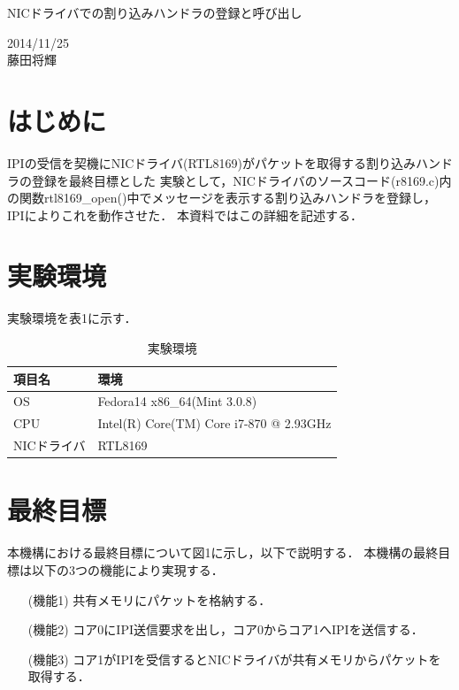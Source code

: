 \documentclass[12pt]{jsarticle}
\begin{document}

\begin{center}
{\LARGE NICドライバでの割り込みハンドラの登録と呼び出し}
\end{center}

\begin{flushright}
  2014/11/25\\
  藤田将輝
\end{flushright}
\section{はじめに}
IPIの受信を契機にNICドライバ(RTL8169)がパケットを取得する割り込みハンドラの登録を最終目標とした
実験として，NICドライバのソースコード(r8169.c)内の関数rtl8169\_open()中でメッセージを表示する割り込みハンドラを登録し，
IPIによりこれを動作させた．
本資料ではこの詳細を記述する．


\section{実験環境}
実験環境を表1に示す．
\begin{table}[htbp]
\caption{実験環境}
\label{kankyou}
\begin{center}
\begin{tabular}{|l|l|}   \hline 
項目名      & 環境    \\ \hline \hline
OS          & Fedora14 x86\_64(Mint 3.0.8)  \\ \hline
CPU         & Intel(R) Core(TM) Core i7-870 @ 2.93GHz \\ \hline
NICドライバ & RTL8169    \\ \hline
           
\end{tabular}
\end{center}
\end{table}



\section{最終目標}
本機構における最終目標について図1に示し，以下で説明する．
本機構の最終目標は以下の3つの機能により実現する．
\begin{itemize}
\item[(機能1)] 共有メモリにパケットを格納する．
\item[(機能2)] コア0にIPI送信要求を出し，コア0からコア1へIPIを送信する．
\item[(機能3)] コア1がIPIを受信するとNICドライバが共有メモリからパケットを取得する．
\end{itemize}
\end{document}
